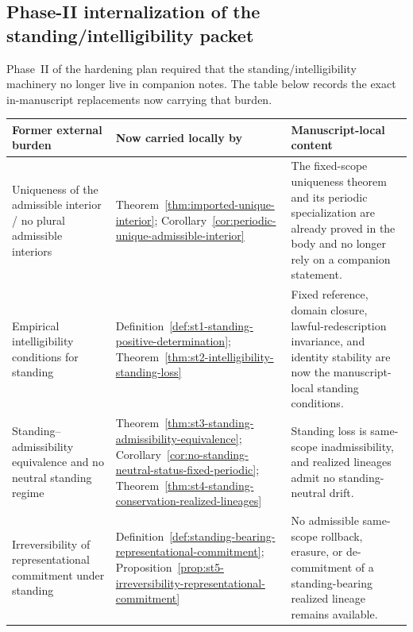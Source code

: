 \subsection*{Phase-II internalization of the standing/intelligibility packet}
Phase~II of the hardening plan required that the standing/intelligibility machinery no longer live in companion notes. The table below records the exact in-manuscript replacements now carrying that burden.

\begin{center}
\footnotesize
\renewcommand{\arraystretch}{1.16}
\setlength{\tabcolsep}{4pt}
\begin{tabularx}{0.98\textwidth}{@{}L{0.31\textwidth}L{0.24\textwidth}Y@{}}
\toprule
\textbf{Former external burden} & \textbf{Now carried locally by} & \textbf{Manuscript-local content}\\
\midrule
Uniqueness of the admissible interior / no plural admissible interiors & Theorem~\ref{thm:imported-unique-interior}; Corollary~\ref{cor:periodic-unique-admissible-interior} & The fixed-scope uniqueness theorem and its periodic specialization are already proved in the body and no longer rely on a companion statement.\\
Empirical intelligibility conditions for standing & Definition~\ref{def:st1-standing-positive-determination}; Theorem~\ref{thm:st2-intelligibility-standing-loss} & Fixed reference, domain closure, lawful-redescription invariance, and identity stability are now the manuscript-local standing conditions.\\
Standing--admissibility equivalence and no neutral standing regime & Theorem~\ref{thm:st3-standing-admissibility-equivalence}; Corollary~\ref{cor:no-standing-neutral-status-fixed-periodic}; Theorem~\ref{thm:st4-standing-conservation-realized-lineages} & Standing loss is same-scope inadmissibility, and realized lineages admit no standing-neutral drift.\\
Irreversibility of representational commitment under standing & Definition~\ref{def:standing-bearing-representational-commitment}; Proposition~\ref{prop:st5-irreversibility-representational-commitment} & No admissible same-scope rollback, erasure, or de-commitment of a standing-bearing realized lineage remains available.\\
\bottomrule
\end{tabularx}
\end{center}

